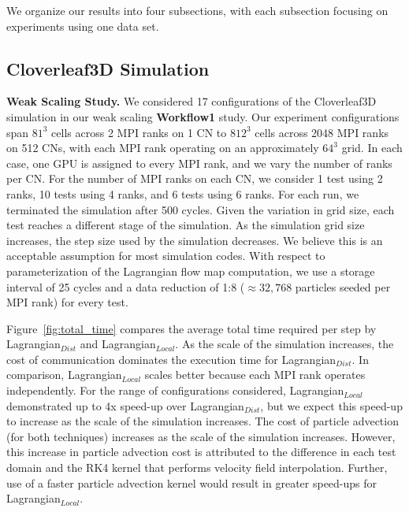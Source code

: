 We organize our results into four subsections, with each subsection focusing on experiments using one data set.

\subsection{Cloverleaf3D Simulation}
\label{sec:clover}

\textbf{Weak Scaling Study.} We considered 17 configurations of the Cloverleaf3D simulation in our weak scaling \textbf{Workflow1} study. 
%
Our experiment configurations span $81^{3}$ cells across 2 MPI ranks on 1 CN to $812^{3}$ cells across 2048 MPI ranks on 512 CNs, with each MPI rank operating on an approximately $64^{3}$ grid.
%
In each case, one GPU is assigned to every MPI rank, and we vary the number of ranks per CN.
%
For the number of MPI ranks on each CN, we consider 1 test using 2 ranks, 10 tests using 4 ranks, and 6 tests using 6 ranks.
%
For each run, we terminated the simulation after 500 cycles.
%
Given the variation in grid size, each test reaches a different stage of the simulation.
%
As the simulation grid size increases, the step size used by the simulation decreases.
%
We believe this is an acceptable assumption for most simulation codes.
%
With respect to parameterization of the Lagrangian flow map computation, we use a storage interval of 25 cycles and a data reduction of 1:8 ($\approx32,768$ particles seeded per MPI rank) for every test.

Figure~\ref{fig:total_time} compares the average total time required per step by Lagrangian$_{Dist}$ and Lagrangian$_{Local}$.
%
As the scale of the simulation increases, the cost of communication dominates the execution time for Lagrangian$_{Dist}$.  
%
In comparison, Lagrangian$_{Local}$ scales better because each MPI rank operates independently.
%
For the range of configurations considered, Lagrangian$_{Local}$ demonstrated up to 4x speed-up over Lagrangian$_{Dist}$,
%
but we expect this speed-up to increase as the scale of the simulation increases.
%
The cost of particle advection (for both techniques) increases as the scale of the simulation increases.
%
However, this increase in particle advection cost is attributed to the difference in each test domain and the RK4 kernel that performs velocity field interpolation.
%
%
Further, use of a faster particle advection kernel would result in greater speed-ups for Lagrangian$_{Local}$.



